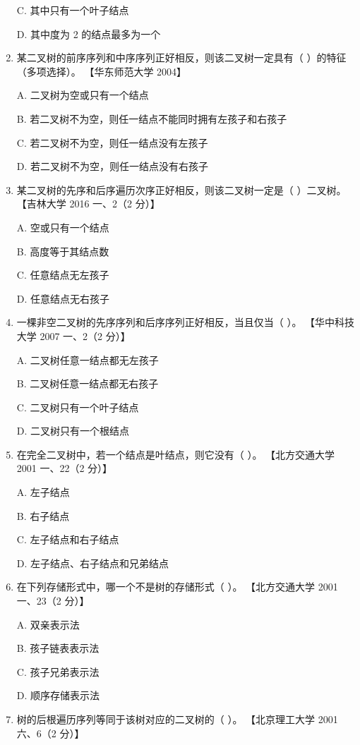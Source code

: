 \documentclass[lang=cn,newtx,10pt,scheme=chinese]{elegantbook}
\begin{document}
\begin{enumerate}
    C. 其中只有一个叶子结点  

    D. 其中度为 2 的结点最多为一个  

    \item 某二叉树的前序序列和中序序列正好相反，则该二叉树一定具有（ ）的特征（多项选择）。  
    【华东师范大学 2004】  

    A. 二叉树为空或只有一个结点  

    B. 若二叉树不为空，则任一结点不能同时拥有左孩子和右孩子 

    C. 若二叉树不为空，则任一结点没有左孩子 

    D. 若二叉树不为空，则任一结点没有右孩子  

    \item 某二叉树的先序和后序遍历次序正好相反，则该二叉树一定是（ ）二叉树。  
    【吉林大学 2016 一、2（2 分）】  

    A. 空或只有一个结点  

    B. 高度等于其结点数  

    C. 任意结点无左孩子  

    D. 任意结点无右孩子  

    \item 一棵非空二叉树的先序序列和后序序列正好相反，当且仅当（ ）。  
    【华中科技大学 2007 一、2（2 分）】  

    A. 二叉树任意一结点都无左孩子  

    B. 二叉树任意一结点都无右孩子  

    C. 二叉树只有一个叶子结点  

    D. 二叉树只有一个根结点  

    \item 在完全二叉树中，若一个结点是叶结点，则它没有（ ）。  
    【北方交通大学 2001 一、22（2 分）】  

    A. 左子结点  

    B. 右子结点  

    C. 左子结点和右子结点  

    D. 左子结点、右子结点和兄弟结点  

    \item 在下列存储形式中，哪一个不是树的存储形式（ ）。  
    【北方交通大学 2001 一、23（2 分）】  

    A. 双亲表示法  

    B. 孩子链表表示法  

    C. 孩子兄弟表示法  

    D. 顺序存储表示法  

    \item 树的后根遍历序列等同于该树对应的二叉树的（ ）。  
    【北京理工大学 2001 六、6（2 分）】  


\end{enumerate}
\end{document}
